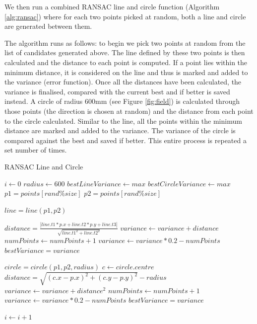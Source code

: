 \documentclass{article}
\begin{document}
We then run a combined RANSAC line and circle function (Algorithm \ref{alg:ransac})  where for each two points picked at random, both a line and circle are generated between them. 

The algorithm  runs as follows: to begin we pick two points at random from the list of candidates generated above. The line defined by these two points is then calculated and the distance to each point is computed. If a point lies within the minimum distance, it is considered on the line and thus is marked and added to the variance (error function). Once all the distances have been calculated, the variance is finalised, compared with the current best and if better is saved instead. A circle of radius 600mm (see Figure \ref{fig:field}) is calculated through those points (the direction is chosen at random) and the distance from each point to the circle calculated. Similar to the line, all the points within the minimum distance are marked and added to the variance. The variance of the circle is compared against the best and saved if better. This entire process is repeated a set number of times.


\begin{algorithm} [h] 
\caption{RANSAC Line and Circle}
\begin{algorithmic} \label{alg:ransac}

\STATE $i \leftarrow 0$
\STATE $radius \leftarrow 600$
\STATE $bestLineVariance \leftarrow max$
\STATE $bestCircleVariance \leftarrow max$
	\STATE $p1 = points[rand\%size]$
	\STATE $p2 = points[rand\%size]$
	
	\STATE $line = line(p1, p2)$
		
		\STATE $distance = \frac{|line.t1*p.x + line.t2*p.y + line.t3|}{\sqrt{line.t1^2 + line.t2^2}}$
			\STATE $variance \leftarrow variance + distance$
			\STATE $numPoints \leftarrow numPoints + 1$
		\ENDIF
	\ENDFOR
	\STATE $variance \leftarrow variance * 0.2 - numPoints$
		\STATE $bestVariance = variance$
	\ENDIF
	
	\STATE $circle = circle(p1, p2, radius)$
		\STATE $c \leftarrow circle.centre$
		\STATE $distance = \sqrt{(c.x - p.x)^2 + (c.y - p.y)^2} - radius$
			\STATE $variance \leftarrow variance + distance^2$
			\STATE $numPoints \leftarrow numPoints + 1$
		\ENDIF
	\ENDFOR
	\STATE $variance \leftarrow variance * 0.2 - numPoints$
		\STATE $bestVariance = variance$
	\ENDIF
	
	\STATE $i \leftarrow i + 1$
\ENDWHILE

\end{algorithmic}
\end{algorithm}
\end{document}
